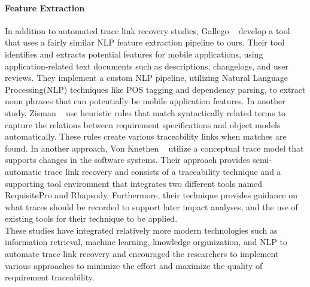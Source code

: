 \paragraph{Feature Extraction}
In addition to automated trace link recovery studies, Gallego \etal{}~\cite{Marf2023TransFeatExAN} develop a tool that uses a fairly similar NLP feature extraction pipeline to ours. Their tool identifies and extracts potential features for mobile applications, using application-related text documents such as descriptions, changelogs, and user reviews. They implement a custom NLP pipeline, utilizing Natural Language Processing(NLP) techniques like POS tagging and dependency parsing, to extract noun phrases that can potentially be mobile application features. In another study, Zisman \etal{}~\cite{zisman-2003} use heuristic rules that match syntactically related terms to capture the relations between requirement specifications and object models automatically. These rules create various traceability links when matches are found. In another approach, Von Knethen \etal{}~\cite{knethen-2003} utilize a conceptual trace model that supports changes in the software systems. Their approach provides semi-automatic trace link recovery and consists of a traceability technique and a supporting tool environment that integrates two different tools named RequisitePro and Rhapsody. Furthermore, their technique provides guidance on what traces should be recorded to support
later impact analyses, and the use of existing tools for their technique to be applied.\\

These studies have integrated relatively more modern technologies such as information retrieval, machine learning, knowledge organization, and NLP to automate trace link recovery and encouraged the researchers to implement various approaches to minimize the effort and maximize the quality of requirement traceability.

